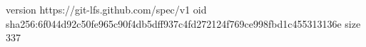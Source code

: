 version https://git-lfs.github.com/spec/v1
oid sha256:6f044d92c50fe965c90f4db5dff937c4fd272124f769ce998fbd1c455313136e
size 337
